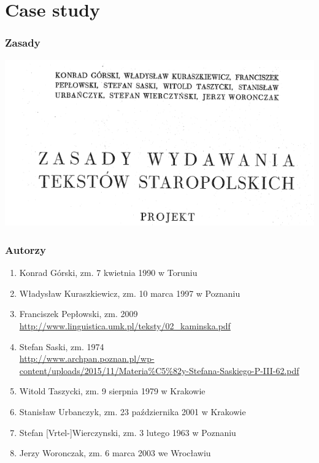 \documentclass[pdfpagemode=UseNone]{beamer}
\begin{document}



  
  
  

\section{Case study}
\label{sec:case-study}
\begin{frame}
  \frametitle{Zasady}
  \includegraphics[width=\hsize]{img/Zasady-tyt}
\end{frame}

\begin{frame}
  \frametitle{Autorzy}
  \begin{enumerate}
  \item Konrad Górski, zm. 7 kwietnia 1990 w Toruniu
  \item Władysław Kuraszkiewicz, zm. 10 marca 1997 w Poznaniu
  \item Franciszek Pepłowski, zm. 2009\\
    {\url{http://www.linguistica.umk.pl/teksty/02_kaminska.pdf}}
  \item Stefan Saski, zm. 1974\\
    {\url{http://www.archpan.poznan.pl/wp-content/uploads/2015/11/Materia\%C5\%82y-Stefana-Saskiego-P-III-62.pdf}}
\item Witold Taszycki, zm. 9 sierpnia 1979 w Krakowie
\item Stanisław Urbanczyk, zm. 23 października 2001 w Krakowie
\item Stefan [Vrtel-]Wierczynski, zm. 3 lutego 1963 w Poznaniu 
\item Jerzy Woronczak, zm. 6 marca 2003 we Wrocławiu
  \end{enumerate}
\end{frame}
\end{document}
